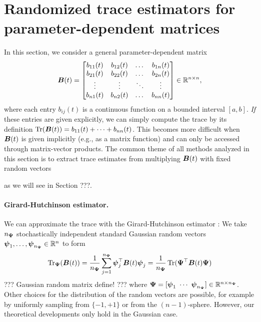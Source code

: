 
\section{Randomized trace estimators for parameter-dependent matrices}
\label{sec:analysis}

\color{blue}
In this section, we consider a general parameter-dependent matrix
\begin{equation*}
    \boldsymbol{B}(t) = \begin{bmatrix}
        b_{11}(t) & b_{12}(t) & \dots & b_{1n}(t) \\
        b_{21}(t) & b_{22}(t) & \dots & b_{2n}(t) \\
        \vdots & \vdots & \ddots & \vdots \\
        b_{n1}(t) & b_{n2}(t) & \dots & b_{nn}(t) \\
    \end{bmatrix} \in \mathbb{R}^{n \times n},
\end{equation*}
where each entry $b_{ij}(t)$ is a continuous function on a bounded interval $[a,b]$. \emph{If} these entries are given explicitly, we can simply compute the trace by its definition 
$\operatorname{Tr}(\boldsymbol{B}(t)) = b_{11}(t)+ \cdots + b_{nn}(t)$. This becomes more difficult when $\boldsymbol{B}(t)$ is given implicitly (e.g., as a matrix function) and can only be accessed through matrix-vector products. The common theme of all methods analyzed in this section is to extract trace estimates from multiplying $\boldsymbol{B}(t)$ with fixed random vectors

as we will see in Section ???.
\color{black}

\paragraph{Girard-Hutchinson estimator.} We can approximate the trace with the Girard-Hutchinson estimator \cite{girard-1989-fast-montecarlo,hutchinson-1990-stochastic-estimator}: We take $n_{\boldsymbol{\Psi}}$ stochastically independent standard Gaussian random vectors $\boldsymbol{\psi}_1,\dots, \boldsymbol{\psi}_{n_{\boldsymbol{\Psi}}} \in \mathbb{R}^{n}$ to form
\begin{equation}
    \operatorname{Tr}_{\boldsymbol{\Psi}}(\boldsymbol{B}(t))
    = \frac{1}{n_{\boldsymbol{\Psi}}} \sum_{j=1}^{n_{\boldsymbol{\Psi}}} \boldsymbol{\psi}_j^{\top} \boldsymbol{B}(t) \boldsymbol{\psi}_j
    = \frac{1}{n_{\boldsymbol{\Psi}}} \operatorname{Tr}( \boldsymbol{\Psi}^{\top} \boldsymbol{B}(t) \boldsymbol{\Psi})
    \label{equ:hutchinson-trace-estimator}
\end{equation}
??? Gaussian random matrix define! ???
where $\boldsymbol{\Psi} = [\boldsymbol{\psi}_1 ~ \cdots ~ \boldsymbol{\psi}_{n_{\boldsymbol{\Psi}}}] \in \mathbb{R}^{n \times n_{\boldsymbol{\Psi}}}$. Other choices for the distribution of the random vectors are possible, for example by uniformly sampling from $\{-1, +1\}$ or from the $(n-1)$-sphere. However, our theoretical developments only hold in the Gaussian case.

